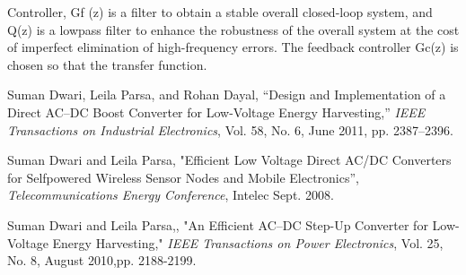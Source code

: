 Controller, Gf (z) is a filter to obtain a stable overall closed-loop system, and Q(z) is a lowpass filter to enhance the robustness of the overall system at the cost of imperfect elimination of high-frequency errors.
The feedback controller Gc(z) is chosen so that the transfer function.



%
%
%
%
%
\clearpage
{}
%
%
\begin{thebibliography}{99}
%
Suman Dwari, Leila Parsa, and Rohan Dayal, “Design and Implementation of a Direct AC–DC Boost Converter for Low-Voltage Energy Harvesting,” {\em IEEE Transactions on Industrial Electronics}, Vol. 58, No. 6, June 2011, pp. 2387–2396.

Suman Dwari and Leila Parsa, "Efficient Low Voltage Direct AC/DC Converters for Selfpowered Wireless Sensor Nodes and Mobile Electronics”, {\em Telecommunications Energy Conference}, Intelec Sept. 2008.

Suman Dwari and Leila Parsa,, "An Efficient AC–DC Step-Up Converter for Low-Voltage Energy Harvesting," {\em IEEE Transactions on Power Electronics}, Vol. 25, No. 8, August 2010,pp. 2188-2199.




%
\end{thebibliography}
%
%
%
%
\clearpage
{}
\chapter*{}

